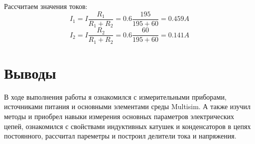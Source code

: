 \documentclass[14pt, a4paper]{article}
\begin{document}
    Рассчитаем значения токов:
    $$I_1 = I\frac{R_1}{R_1 + R_2} = 0.6 \frac{195}{195 + 60} = 0.459 A$$
    $$I_2 = I\frac{R_2}{R_1 + R_2} = 0.6 \frac{60}{195 + 60} = 0.141 A$$

    \clearpage


    \section*{Выводы}

    

    В ходе выполнения работы я ознакомился с измерительными приборами, 
    источниками питания и основными элементами среды Multisim. 
    А также изучил методы и приобрел навыки измерения основных параметров электрических цепей,
    ознакомился с свойствами индуктивных катушек и конденсаторов в цепях постоянного,
    рассчитал пареметры и построил делители тока и напряжения.
\end{document}
